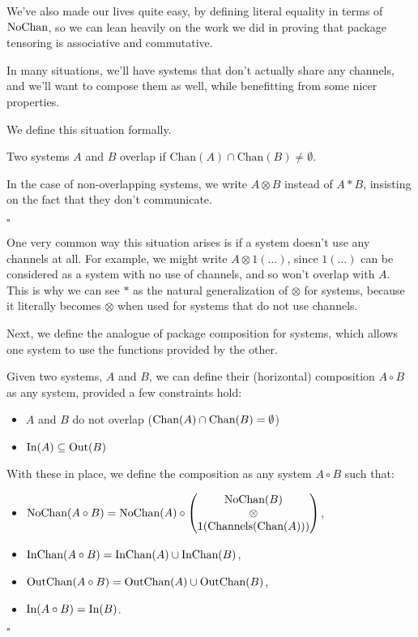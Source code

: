 We've also made our lives quite easy, by defining literal
equality in terms of $\text{NoChan}$, so we can lean
heavily on the work we did in proving that package tensoring
is associative and commutative.

In many situations, we'll have systems that don't actually share
any channels, and we'll want to compose them as well, while
benefitting from some nicer properties.

We define this situation formally.

\begin{definition}
Two systems $A$ and $B$ overlap if $\text{Chan}(A) \cap \text{Chan}(B) \neq \emptyset$.

In the case of non-overlapping systems, we write $A \otimes B$ instead of $A * B$,
insisting on the fact that they don't communicate.

$\square$
\end{definition}

One very common way this situation arises is if a system doesn't
use any channels at all.
For example, we might write $A \otimes 1(\ldots)$,
since $1(\ldots)$ can be considered as a system with no use of channels,
and so won't overlap with $A$.
This is why we can see $*$ as the natural generalization of $\otimes$
for systems, because it literally becomes $\otimes$ when used
for systems that do not use channels.

Next, we define the analogue of package composition for systems,
which allows one system to use the functions provided by the other.

\begin{definition}
Given two systems, $A$ and $B$, we can define their (horizontal) composition
$A \circ B$ as any system, provided a few constraints hold:
\begin{itemize}
\item $A$ and $B$ do not overlap ($\text{Chan}(A) \cap \text{Chan}(B) = \emptyset$)
\item $\text{In}(A) \subseteq \text{Out}(B)$
\end{itemize}

With these in place, we define the composition as any system $A \circ B$ such that:
\begin{itemize}
  \item $\text{NoChan}(A \circ B) = \text{NoChan}(A) \circ \begin{pmatrix}
    \text{NoChan}(B)\cr
    \otimes\cr
    1(\text{Channels}(\text{Chan}(A)))
  \end{pmatrix}
    $,
  \item $\text{InChan}(A \circ B) = \text{InChan}(A) \cup \text{InChan}(B)$,
  \item $\text{OutChan}(A \circ B) = \text{OutChan}(A) \cup \text{OutChan}(B)$,
  \item $\text{In}(A \circ B) = \text{In}(B)$.
\end{itemize}

$\square$
\end{definition}


